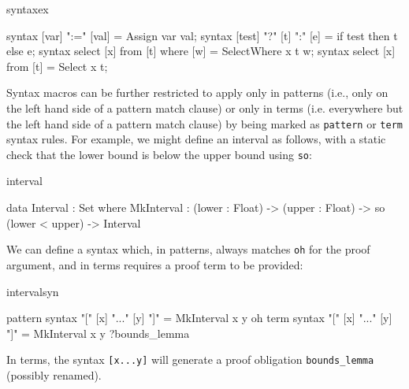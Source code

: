 \begin{SaveVerbatim}{syntaxex}

syntax [var] ":=" [val]              = Assign var val;
syntax [test] "?" [t] ":" [e]        = if test then t else e;
syntax select [x] from [t] where [w] = SelectWhere x t w;
syntax select [x] from [t]           = Select x t;

\end{SaveVerbatim}

\noindent
Syntax macros can be further restricted to apply only in patterns (i.e., only on the left
hand side of a pattern match clause) or only in terms (i.e. everywhere but the left hand side
of a pattern match clause) by being marked as \texttt{pattern} or \texttt{term} syntax
rules. For example, we might define an interval as follows, with a static check
that the lower bound is below the upper bound using \texttt{so}:

\begin{SaveVerbatim}{interval}

data Interval : Set where
   MkInterval : (lower : Float) -> (upper : Float) -> 
                so (lower < upper) -> Interval

\end{SaveVerbatim}

\noindent
We can define a syntax which, in patterns, always matches \texttt{oh} for the proof 
argument, and in terms requires a proof term to be provided:

\begin{SaveVerbatim}{intervalsyn}

pattern syntax "[" [x] "..." [y] "]" = MkInterval x y oh
term    syntax "[" [x] "..." [y] "]" = MkInterval x y ?bounds_lemma

\end{SaveVerbatim}

\noindent
In terms, the syntax \texttt{[x...y]} will generate a proof obligation
\texttt{bounds\_lemma} (possibly renamed).

